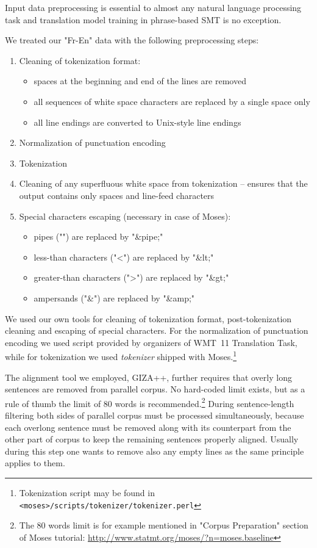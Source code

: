 Input data preprocessing is essential to almost any natural language processing task
and translation model training in phrase-based SMT is no exception.

We treated our "Fr-En" data with the following preprocessing steps:
\begin{enumerate}
  \item Cleaning of tokenization format:
  \begin{itemize}
    \item spaces at the beginning and end of the lines are removed
    \item all sequences of white space characters are replaced by a single space only
    \item all line endings are converted to Unix-style line endings
  \end{itemize}
  \item Normalization of punctuation encoding
  \item Tokenization
  \item Cleaning of any superfluous white space from tokenization -- ensures that the output contains only spaces and line-feed characters
  \item Special characters escaping (necessary in case of Moses):
  \begin{itemize}
    \item pipes ("\textbar") are replaced by "\&pipe;"
    \item less-than characters ("<") are replaced by "\&lt;"
    \item greater-than characters (">") are replaced by "\&gt;"
    \item ampersands ("\&") are replaced by "\&amp;"
  \end{itemize}
\end{enumerate}

We used our own tools for cleaning of tokenization format, post-tokenization cleaning
and escaping of special characters.
For the normalization of punctuation encoding we used script provided by organizers of
WMT~11 Translation Task,
while for tokenization we used \emph{tokenizer} shipped with
Moses.\footnote{Tokenization script may be found in \texttt{<moses>/scripts/tokenizer/tokenizer.perl}}

The alignment tool we employed, GIZA++, further requires that overly long sentences are
removed from parallel corpus.
No hard-coded limit exists, but as a rule of thumb the limit of 80 words is
recommended.\footnote{The 80 words limit is for example mentioned in "Corpus Preparation"
section of Moses tutorial: \url{http://www.statmt.org/moses/?n=moses.baseline}}
During sentence-length filtering both sides of parallel corpus must be
processed simultaneously, because each overlong sentence must be removed along
with its counterpart from the other part of corpus to keep the remaining sentences
properly aligned.
Usually during this step one wants to remove also any empty lines as the same principle
applies to them.


